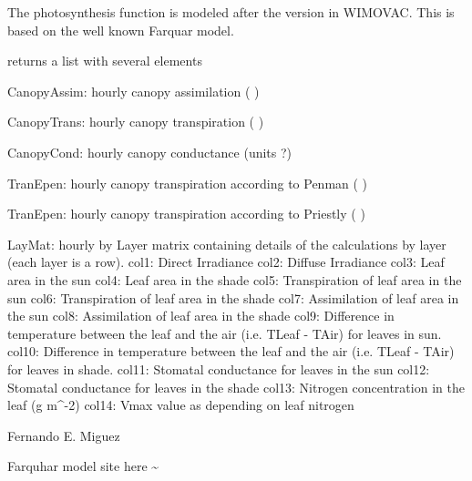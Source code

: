 \documentclass[letterpaper]{book}
\begin{document}
%
\begin{Details}\relax
The photosynthesis function is modeled after the version in
WIMOVAC.  This is based on the well known Farquar model.
\end{Details}
%
\begin{Value}

returns a list with several elements

CanopyAssim: hourly canopy assimilation ( )

CanopyTrans: hourly canopy transpiration ( )

CanopyCond: hourly canopy conductance (units ?)

TranEpen: hourly canopy transpiration according to Penman
( )

TranEpen: hourly canopy transpiration according to Priestly
( )

LayMat: hourly by Layer matrix containing details of the
calculations by layer (each layer is a row).  col1: Direct
Irradiance col2: Diffuse Irradiance col3: Leaf area in the
sun col4: Leaf area in the shade col5: Transpiration of
leaf area in the sun col6: Transpiration of leaf area in
the shade col7: Assimilation of leaf area in the sun col8:
Assimilation of leaf area in the shade col9: Difference in
temperature between the leaf and the air (i.e. TLeaf -
TAir) for leaves in sun.  col10: Difference in temperature
between the leaf and the air (i.e. TLeaf - TAir) for leaves
in shade.  col11: Stomatal conductance for leaves in the
sun col12: Stomatal conductance for leaves in the shade
col13: Nitrogen concentration in the leaf (g m\textasciicircum{}-2) col14:
Vmax value as depending on leaf nitrogen
\end{Value}
%
\begin{Author}\relax
Fernando E. Miguez
\end{Author}
%
\begin{References}\relax
Farquhar model 
site here \textasciitilde{}
\end{References}
%
\begin{Examples}
\end{Examples}
\end{document}
